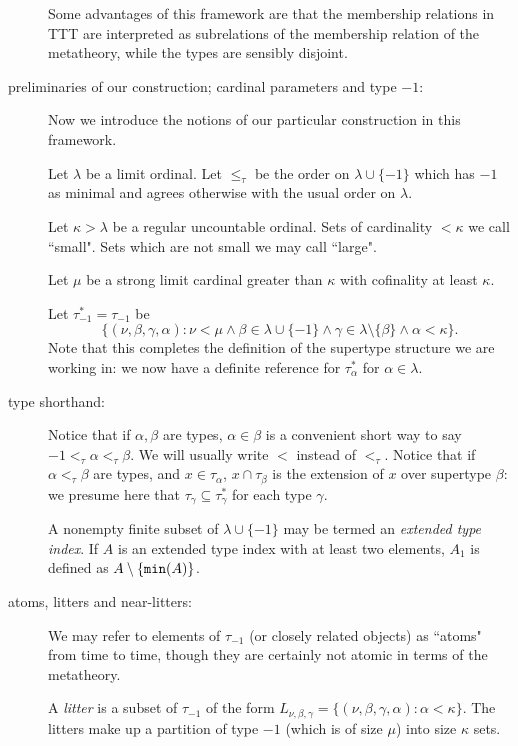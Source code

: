 \documentclass[112pt]{article}
\begin{document}
\begin{description}
Some advantages of this framework are that the membership relations in TTT are interpreted as subrelations of the membership relation of the metatheory, while the types are sensibly disjoint.

\item[preliminaries of our construction;  cardinal parameters and type $-1$:]Now we introduce the notions of our particular construction in this framework.

Let $\lambda$ be a limit ordinal.  Let $\leq_\tau$ be the order on $\lambda \cup \{-1\}$ which has $-1$ as minimal and agrees otherwise with the usual order on $\lambda$.

Let $\kappa>\lambda$ be a regular uncountable ordinal.  Sets of cardinality $<\kappa$ we call ``small".  Sets which are not small we may call ``large".

Let $\mu$ be a strong limit cardinal greater than $\kappa$ with cofinality at least $\kappa$.

Let $\tau^*_{-1}=\tau_{-1}$ be $$\{(\nu,\beta,\gamma,\alpha):\nu<\mu \wedge  \beta \in \lambda\cup \{-1\} \wedge \gamma \in \lambda \setminus \{\beta\}\wedge \alpha<\kappa\}.$$  Note that this completes the definition of the supertype structure we are working in:  we now have a definite reference
for $\tau^*_\alpha$ for $\alpha\in \lambda$.

\item[type shorthand:]  Notice that if $\alpha,\beta$ are types, $\alpha\in \beta$ is a convenient short way to say $-1 <_\tau \alpha <_\tau \beta$.   We will usually write $<$ instead of $<_\tau$.  Notice that if $\alpha<_\tau \beta$ are types, and $x \in \tau_\alpha$, $x \cap \tau_\beta$ is the extension of $x$ over supertype $\beta$:  we presume here that $\tau_\gamma \subseteq \tau^*_\gamma$ for each type $\gamma$.

A nonempty finite subset of $\lambda \cup \{-1\}$ may be termed an {\em extended type index}.  If $A$ is an extended type index with at least two elements, $A_1$ is defined as $A \setminus \{{\tt min}(A)\}$.

\item[atoms, litters and near-litters:]  

We may refer to elements of $\tau_{-1}$ (or closely related objects) as ``atoms" from time to time, though they are certainly not atomic in terms of the metatheory.

A {\em litter\/} is a subset of $\tau_{-1}$ of the form $L_{\nu,\beta,\gamma} = \{(\nu,\beta,\gamma,\alpha):\alpha<\kappa\}$.  The litters make up a partition of type $-1$
(which is of size $\mu$) into size $\kappa$ sets.


\end{description}
\end{document}
